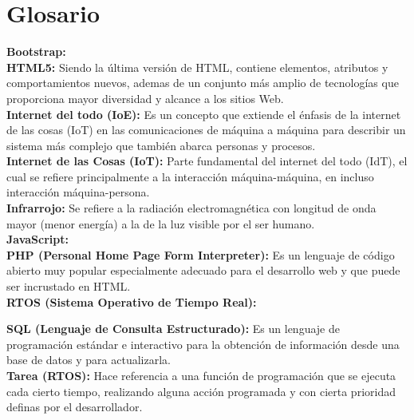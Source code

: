 \chapter*{Glosario}%

\textbf{Bootstrap:}\\


\textbf{HTML5:} Siendo la última versión de HTML, contiene elementos, atributos y comportamientos nuevos, ademas de un conjunto más amplio de tecnologías que proporciona mayor diversidad y alcance a los sitios Web. \\

\textbf{Internet del todo (IoE):} Es un concepto que extiende el énfasis de la internet de las cosas (IoT) en las comunicaciones de máquina a máquina para describir un sistema más complejo que también abarca personas y procesos.\cite{IOE} \\

\textbf{Internet de las Cosas (IoT):} Parte fundamental del internet del todo (IdT), el cual se refiere principalmente a la interacción máquina-máquina, en incluso interacción máquina-persona.\\

\textbf{Infrarrojo:} Se refiere a la radiación electromagnética con longitud de onda mayor (menor energía) a la de la luz visible por el ser humano.\\

\textbf{JavaScript:}\\

\textbf{PHP (Personal Home Page Form Interpreter):} Es un lenguaje de código abierto muy popular especialmente adecuado para el desarrollo web y que puede ser incrustado en HTML.\\

\textbf{RTOS (Sistema Operativo de Tiempo Real):}

\textbf{SQL (Lenguaje de Consulta Estructurado):} Es un lenguaje de programación estándar e interactivo para la obtención de información desde una base de datos y para actualizarla.\\

\textbf{Tarea (RTOS):} Hace referencia a una función de programación que se ejecuta cada cierto tiempo, realizando alguna acción programada y con cierta prioridad definas por el desarrollador.